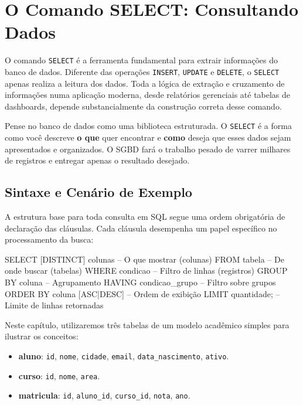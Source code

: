 \chapter{O Comando SELECT: Consultando Dados}

O comando \texttt{SELECT} é a ferramenta fundamental para extrair informações do banco de dados. Diferente das operações \texttt{INSERT}, \texttt{UPDATE} e \texttt{DELETE}, o \texttt{SELECT} apenas realiza a leitura dos dados. Toda a lógica de extração e cruzamento de informações numa aplicação moderna, desde relatórios gerenciais até tabelas de dashboards, depende substancialmente da construção correta desse comando.

\begin{observacao}
Pense no banco de dados como uma biblioteca estruturada. O \texttt{SELECT} é a forma como você descreve \textbf{o que} quer encontrar e \textbf{como} deseja que esses dados sejam apresentados e organizados. O SGBD fará o trabalho pesado de varrer milhares de registros e entregar apenas o resultado desejado.
\end{observacao}

\section{Sintaxe e Cenário de Exemplo}

A estrutura base para toda consulta em SQL segue uma ordem obrigatória de declaração das cláusulas. Cada cláusula desempenha um papel específico no processamento da busca:

\begin{sqlcode}
SELECT  [DISTINCT] colunas    -- O que mostrar (colunas)
FROM    tabela                -- De onde buscar (tabelas)
WHERE   condicao              -- Filtro de linhas (registros)
GROUP BY coluna               -- Agrupamento
HAVING  condicao_grupo        -- Filtro sobre grupos
ORDER BY coluna [ASC|DESC]    -- Ordem de exibição
LIMIT   quantidade;           -- Limite de linhas retornadas
\end{sqlcode}

Neste capítulo, utilizaremos três tabelas de um modelo acadêmico simples para ilustrar os conceitos:
\begin{itemize}
    \item \textbf{aluno}: \texttt{id}, \texttt{nome}, \texttt{cidade}, \texttt{email}, \texttt{data\_nascimento}, \texttt{ativo}.
    \item \textbf{curso}: \texttt{id}, \texttt{nome}, \texttt{area}.
    \item \textbf{matricula}: \texttt{id}, \texttt{aluno\_id}, \texttt{curso\_id}, \texttt{nota}, \texttt{ano}.
\end{itemize}

